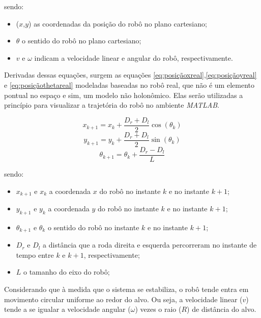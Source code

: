 sendo:
\begin{itemize}
	\item ($x$,$y$) as coordenadas da posição do robô no plano cartesiano;
	\item $\theta$ o sentido do robô no plano cartesiano;
	\item $v$ e $\omega$ indicam a velocidade linear e angular do robô, respectivamente.	
\end{itemize}

Derivadas dessas equações, surgem as equações \ref*{eq:posiçãoxreal},\ref*{eq:posiçãoyreal} e \ref*{eq:posiçãothetareal} modeladas baseadas no robô real, que não é um elemento pontual no espaço e sim, um modelo não holonômico. Elas serão utilizadas a princípio para visualizar a trajetória do robô no ambiente \emph{MATLAB\textregistered}.

\begin{equation}
x_{k+1} = x_{k} + \dfrac{D_{r} + D_{l}}{2}\cos(\theta_{k}) 
\label{eq:posiçãoxreal}
\end{equation}
\begin{equation}
y_{k+1} = y_{k} + \dfrac{D_{r} + D_{l}}{2}\sin(\theta_{k}) 
\label{eq:posiçãoyreal}
\end{equation}
\begin{equation}
\theta_{k+1} = \theta_{k} + \dfrac{D_{r} - D_{l}}{L}
\label{eq:posiçãothetareal}
\end{equation}

sendo:
\begin{itemize}
	\item $x_{k+1}$ e $x_{k}$ a coordenada $x$ do robô no instante $k$ e no instante $k+1$;
	\item $y_{k+1}$ e $y_{k}$ a coordenada $y$ do robô no instante $k$ e no instante $k+1$;
	\item $\theta_{k+1}$ e $\theta_{k}$ o sentido do robô no instante $k$ e no instante $k+1$;	
	\item $D_{r}$ e $D_{l}$ a distância que a roda direita e esquerda percorreram no instante de tempo entre $k$ e $k+1$, respectivamente;
	\item $L$ o tamanho do eixo do robô;
\end{itemize}

Considerando que à medida que o sistema se estabiliza, o robô tende entra em movimento circular uniforme ao redor do alvo. Ou seja, a velocidade linear ($v$) tende a se igualar a velocidade angular ($\omega$) vezes o raio ($R$) de distância do alvo.

